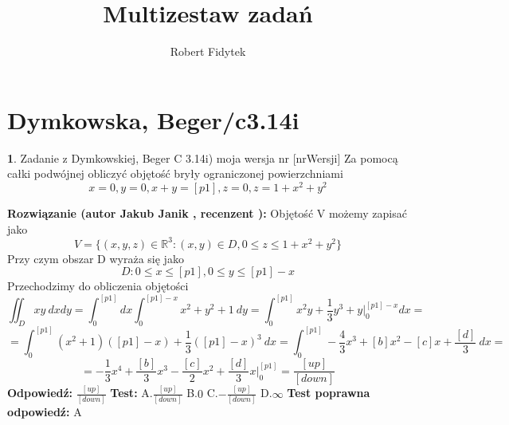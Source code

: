 \documentclass[12pt, a4paper]{article}
\title{Multizestaw zadań}
\author{Robert Fidytek}
\date{}
\theoremstyle{definition} %
\newtheorem{zad}{}
\newcommand{\kategoria}[1]{\section{#1}} %
\newcommand{\zadStart}[1]{\begin{zad}#1\newline} %
\newcommand{\zadStop}{\end{zad}}   %
\newcommand{\rozwStart}[2]{\noindent \textbf{Rozwiązanie (autor #1 , recenzent #2): }\newline} %
\newcommand{\rozwStop}{\newline}                                            %
\newcommand{\odpStart}{\noindent \textbf{Odpowiedź:}\newline}    %
\newcommand{\odpStop}{\newline}                                             %
\newcommand{\testStart}{\noindent \textbf{Test:}\newline} %
\newcommand{\testStop}{\newline} %
\newcommand{\kluczStart}{\noindent \textbf{Test poprawna odpowiedź:}\newline} %
\newcommand{\kluczStop}{\newline} %
\begin{document}
\maketitle


\kategoria{Dymkowska, Beger/c3.14i}
\zadStart{Zadanie z Dymkowskiej, Beger C 3.14i) moja wersja nr [nrWersji]}
Za pomocą całki podwójnej obliczyć objętość bryły ograniczonej powierzchniami $$x=0, y=0, x+y=[p1], z=0, z=1+x^2+y^2$$
\zadStop
\rozwStart{Jakub Janik}{}
Objętość V możemy zapisać jako
$$V=\{(x,y,z)\in\mathbb{R}^3\colon(x,y)\in D, 0 \leq z \leq 1+x^2+y^2\}$$
Przy czym obszar D wyraża się jako
$$D\colon 0 \leq x \leq [p1], 0 \leq y \leq [p1]-x$$
Przechodzimy do obliczenia objętości
$$\iint_D xy\ dxdy=\int_0^{[p1]}dx\int_0^{[p1]-x}x^2+y^2+1\ dy=\int_0^{[p1]}x^2y+\frac{1}{3}y^3+y\Big|_0^{[p1]-x}dx=$$
$$=\int_0^{[p1]}(x^2+1)([p1]-x)+\frac{1}{3}([p1]-x)^3\ dx=\int_0^{[p1]}-\frac{4}{3}x^3+[b]x^2-[c]x+\frac{[d]}{3}\ dx=$$
$$=-\frac{1}{3}x^4+\frac{[b]}{3}x^3-\frac{[c]}{2}x^2+\frac{[d]}{3}x\Big|_0^{[p1]}=\frac{[up]}{[down]}$$
\rozwStop
\odpStart
$\frac{[up]}{[down]}$
\odpStop
\testStart
A.$\frac{[up]}{[down]}$
B.$0$
C.$-\frac{[up]}{[down]}$
D.$\infty$
\testStop
\kluczStart
A
\kluczStop
\end{document}
